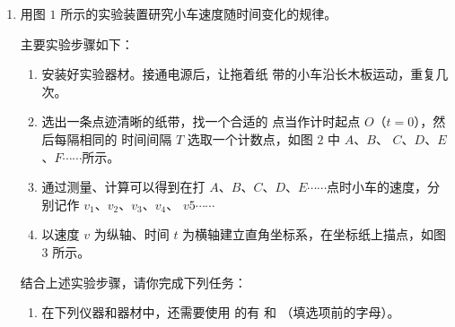 \begin{enumerate}
\newpage
\item 
{}
用图 $ 1 $ 所示的实验装置研究小车速度随时间变化的规律。
\begin{figure}[h!]
\centering

\end{figure}


主要实验步骤如下：
\begin{enumerate}
\renewcommand{\labelenumii}{$ \alph{enumii} $.}
\item






安装好实验器材。接通电源后，让拖着纸
带的小车沿长木板运动，重复几次。


\item 
选出一条点迹清晰的纸带，找一个合适的
点当作计时起点 $ O $（$ t=0 $），然后每隔相同的
时间间隔 $ T $ 选取一个计数点，如图 $ 2 $ 中 $ A $、$ B $、
$ C $、$ D $、$ E $、$ F \cdots \cdots $所示。
\begin{figure}[h!]
\centering

\end{figure}




\item 
通过测量、计算可以得到在打 $ A $、$ B $、$ C $、$ D $、$ E \cdots \cdots $点时小车的速度，分别记作 $ v_{1} $、$ v_{2} $、$ v_{3} $、$ v_{4} $、
$ v5 \cdots \cdots $


\item 
以速度 $ v $ 为纵轴、时间 $ t $ 为横轴建立直角坐标系，在坐标纸上描点，如图 $ 3 $ 所示。
\begin{figure}[h!]
\centering

\end{figure}

\end{enumerate}




结合上述实验步骤，请你完成下列任务：
\begin{enumerate}
\renewcommand{\labelenumi}{\arabic{enumi}.}
\item
在下列仪器和器材中，还需要使用
的有
和
（填选项前的字母）。


\end{enumerate}
\end{enumerate}
